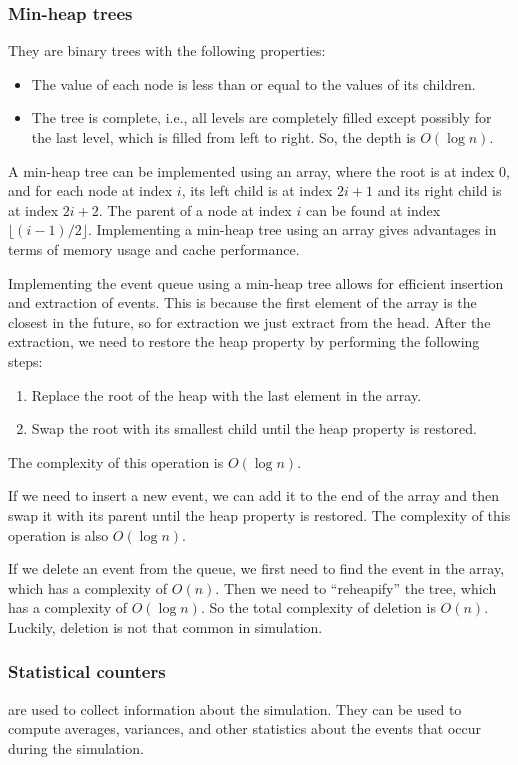 \subsubsection{Min-heap trees}
They are binary trees with the following properties:
\begin{itemize}
\item The value of each node is less than or equal to the values of its children.
\item The tree is complete, i.e., all levels are completely filled except possibly for the last level, which is filled from left to right. So, the depth is $O(\log n)$.
\end{itemize}
A min-heap tree can be implemented using an array, where the root is at index 0, and for each node at index $i$, its left child is at index $2i + 1$ and its right child is at index $2i + 2$.
The parent of a node at index $i$ can be found at index $\lfloor (i - 1) / 2 \rfloor$. Implementing a min-heap tree using an array gives advantages in terms of memory usage and cache performance.

Implementing the event queue using a min-heap tree allows for efficient insertion and extraction of events. This is because the first element of the array is the closest in the future, so for extraction we just extract from the head.
After the extraction, we need to restore the heap property by performing the following steps:
\begin{enumerate}
\item Replace the root of the heap with the last element in the array.
\item Swap the root with its smallest child until the heap property is restored.
\end{enumerate}
The complexity of this operation is $O(\log n)$.

If we need to insert a new event, we can add it to the end of the array and then swap it with its parent until the heap property is restored. The complexity of this operation is also $O(\log n)$.

If we delete an event from the queue, we first need to find the event in the array, which has a complexity of $O(n)$. Then we need to ``reheapify'' the tree, which has a complexity of $O(\log n)$. So the total complexity of deletion is $O(n)$. Luckily, deletion is not that common in simulation.

\subsubsection{Statistical counters}
 are used to collect information about the simulation. They can be used to compute averages, variances, and other statistics about the events that occur during the simulation.

